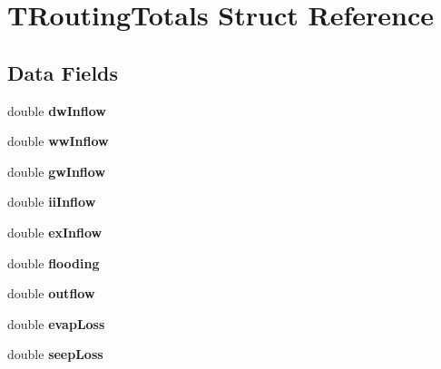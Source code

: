 \hypertarget{struct_t_routing_totals}{}\section{T\+Routing\+Totals Struct Reference}
\label{struct_t_routing_totals}
\subsection*{Data Fields}
\begin{DoxyCompactItemize}
\item 
\mbox{\label{struct_t_routing_totals_aad826ba551d0d47a3375a0aa5ab670a1}} 
double {\bfseries dw\+Inflow}
\item 
\mbox{\label{struct_t_routing_totals_a916c3c738ad9533fe67ac333c7601801}} 
double {\bfseries ww\+Inflow}
\item 
\mbox{\label{struct_t_routing_totals_a9f7763649d3242a5c8052b7c86606c5f}} 
double {\bfseries gw\+Inflow}
\item 
\mbox{\label{struct_t_routing_totals_aac9350594fb45d1f01bfce7767c69eb5}} 
double {\bfseries ii\+Inflow}
\item 
\mbox{\label{struct_t_routing_totals_a5423c8c59b3ca49c1dfcf75dac143ba8}} 
double {\bfseries ex\+Inflow}
\item 
\mbox{\label{struct_t_routing_totals_aa48c1cc93a4f2addd62bc014aec89307}} 
double {\bfseries flooding}
\item 
\mbox{\label{struct_t_routing_totals_aaf1c79727a0621664d840d934eb027af}} 
double {\bfseries outflow}
\item 
\mbox{\label{struct_t_routing_totals_a3bd47dbb068d3930a0c69000be666399}} 
double {\bfseries evap\+Loss}
\item 
\mbox{\label{struct_t_routing_totals_aee431dcfcae47ca4532349a016ed21a5}} 
double {\bfseries seep\+Loss}
\item 

\end{DoxyCompactItemize}
